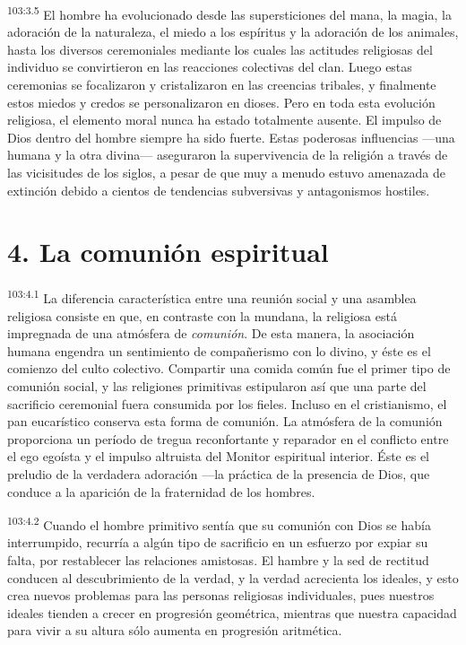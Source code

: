 \documentclass[twoside, 11pt]{book}
\begin{document}
\par
\textsuperscript{103:3.5} El hombre ha evolucionado desde las supersticiones del mana, la magia, la adoración de la naturaleza, el miedo a los espíritus y la adoración de los animales, hasta los diversos ceremoniales mediante los cuales las actitudes religiosas del individuo se convirtieron en las reacciones colectivas del clan. Luego estas ceremonias se focalizaron y cristalizaron en las creencias tribales, y finalmente estos miedos y credos se personalizaron en dioses. Pero en toda esta evolución religiosa, el elemento moral nunca ha estado totalmente ausente. El impulso de Dios dentro del hombre siempre ha sido fuerte. Estas poderosas influencias ---una humana y la otra divina--- aseguraron la supervivencia de la religión a través de las vicisitudes de los siglos, a pesar de que muy a menudo estuvo amenazada de extinción debido a cientos de tendencias subversivas y antagonismos hostiles.

\section*{4. La comunión espiritual}
\par
\textsuperscript{103:4.1} La diferencia característica entre una reunión social y una asamblea religiosa consiste en que, en contraste con la mundana, la religiosa está impregnada de una atmósfera de \textit{comunión}. De esta manera, la asociación humana engendra un sentimiento de compañerismo con lo divino, y éste es el comienzo del culto colectivo. Compartir una comida común fue el primer tipo de comunión social, y las religiones primitivas estipularon así que una parte del sacrificio ceremonial fuera consumida por los fieles. Incluso en el cristianismo, el pan eucarístico conserva esta forma de comunión. La atmósfera de la comunión proporciona un período de tregua reconfortante y reparador en el conflicto entre el ego egoísta y el impulso altruista del Monitor espiritual interior. Éste es el preludio de la verdadera adoración ---la práctica de la presencia de Dios, que conduce a la aparición de la fraternidad de los hombres.

\par
\textsuperscript{103:4.2} Cuando el hombre primitivo sentía que su comunión con Dios se había interrumpido, recurría a algún tipo de sacrificio en un esfuerzo por expiar su falta, por restablecer las relaciones amistosas. El hambre y la sed de rectitud conducen al descubrimiento de la verdad, y la verdad acrecienta los ideales, y esto crea nuevos problemas para las personas religiosas individuales, pues nuestros ideales tienden a crecer en progresión geométrica, mientras que nuestra capacidad para vivir a su altura sólo aumenta en progresión aritmética.
\end{document}
